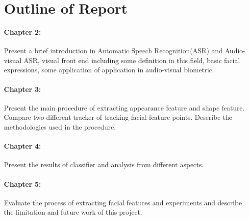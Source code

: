 \section{Outline of Report}
\paragraph{Chapter 2:} Present a brief introduction in Automatic Speech Recognition(ASR) and Audio-visual ASR, visual front end including some definition in this field, basic facial expressions, some application of application in audio-visual biometric.
\paragraph{Chapter 3:} Present the main procedure of extracting appearance feature and shape feature. Compare two different tracker of tracking facial feature points. Describe the methodologies used in the procedure.
\paragraph{Chapter 4:} Present the results of classifier and analysis from different aspects.
\paragraph{Chapter 5:} Evaluate the process of extracting facial features and experiments and describe the limitation and future work of this project.